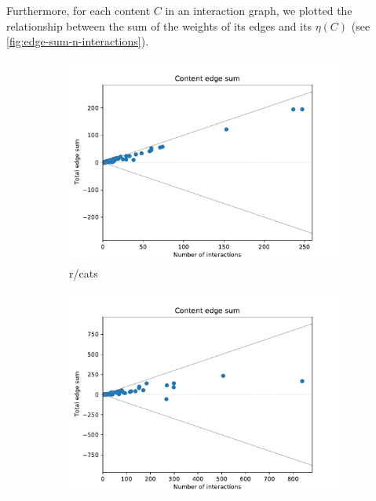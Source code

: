 \bigskip
Furthermore, for each content $C$ in an interaction graph, we plotted the relationship between the sum of
the weights of its edges and its
$\eta(C)$ (see \autoref{fig:edge-sum-n-interactions}).

\begin{figure}
	\begin{center}
		\begin{subfigure}[b]{0.4\textwidth}
			\centering
			\includegraphics[width=\textwidth]{tex/out/cats200/edge-sum-n-interactions.pdf}
			\caption{r/cats}
			\label{fig:tex/out/cats200/edge-sum-n-interactions.pdf}
		\end{subfigure}
		\begin{subfigure}[b]{0.4\textwidth}
			\centering
			\includegraphics[width=\textwidth]{tex/out/covid19200/edge-sum-n-interactions.pdf}

\end{subfigure}
\end{center}
\end{figure}
